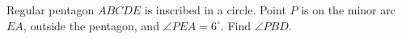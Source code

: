 Regular pentagon $ABCDE$ is inscribed in a circle. Point $P$ is on the minor arc $EA$, outside the pentagon, and $\angle PEA=6^\circ$. Find $\angle PBD$.
